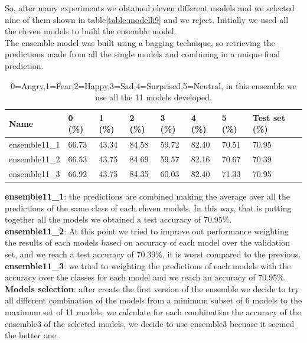 \documentclass[10pt,twocolumn,letterpaper]{article}
\begin{document}
So, after many experiments we obtained eleven different models and we selected nine of them shown in table\ref{table:modelli9} and we reject. Initially we used all the eleven models to build the ensemble model.\\
The ensemble model was built using a bagging technique, so retrieving the predictions made from all the single models and combining in a unique final prediction. 
\def\arraystretch{1.2}
\begin{table}[H]
   \scriptsize
   \begin{tabular}{L{1.1cm}C{0.5cm}C{0.5cm}C{0.5cm}C{0.5cm}C{0.5cm}C{0.5cm}C{0.8cm}}
      \hline
      Name          & 0 (\%) & 1 (\%) & 2 (\%) & 3 (\%) & 4 (\%) & 5 (\%) & Test set (\%) \\
      \hline\hline
      ensemble11\_1 & 66.73  & 43.34  & 84.58  & 59.72  & 82.40  & 70.51  & 70.95         \\
      ensemble11\_2 & 66.53  & 43.75  & 84.69  & 59.57  & 82.16  & 70.67  & 70.39         \\
      ensemble11\_3 & 66.92  & 43.75  & 84.35  & 60.03  & 82.40  & 71.33  & 70.95         \\
      \hline
   \end{tabular}
   \caption{ 0=Angry,1=Fear,2=Happy,3=Sad,4=Surprised,5=Neutral, in this ensemble we use all the 11 models developed.}
   \label{table:accuracymodelli}
\end{table}
\textbf{ensemble11\_1}: the predictions are combined making the average over all the predictions of the same class of each eleven models. In this way, that is putting together all the models we obtained a test accuracy of 70.95\%.\\
\textbf{ensemble11\_2}: At this point we tried to improve out performance weighting the results of each models based on accuracy of each model over the validation set, and we reach a test accuracy of 70.39\%, it is worst compared to the previous. \\
\textbf{ensemble11\_3}: we tried to weighting the predictions of each models with the accuracy over the classes for each model and we reach an accuracy of 70.95\%.  \\

\noindent\textbf{Models selection}: after create the first version of the ensemble we decide to try all different combination of the models from a minimum subset of 6 models to the maximum set of 11 models, we calculate for each combination the accuracy of the ensemble3 of the selected models, we decide to use ensemble3 becuase it seemed the better one. 
\end{document}
